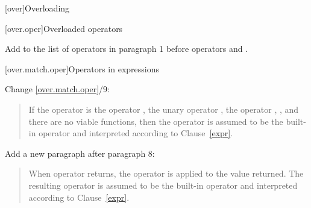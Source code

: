 
\setcounter{chapter}{12}
[over]{Overloading}

\setcounter{section}{4}
[over.oper]{Overloaded operators}

Add  to the list of operators in paragraph 1 before operators \tcode{()} and \tcode{[]}.

\setcounter{section}{3}
\setcounter{subsection}{1}
\setcounter{subsubsection}{1}
[over.match.oper]{Operators in expressions}%

Change \ref{over.match.oper}/9:

\begin{quote}
\setcounter{Paras}{8}
\pnum
If the operator is the operator
\tcode{,},
the unary operator
\tcode{\&},
 the operator
\tcode{->},
,
and there are no viable functions, then the operator is
assumed to be the built-in operator and interpreted according to
Clause~\ref{expr}.
\end{quote}

Add a new paragraph after paragraph 8:

\begin{quote}
\setcounter{Paras}{8}
\pnum
  When operator  returns, the  operator is applied to the value returned. The resulting  operator is assumed to be the built-in operator and interpreted according to Clause~\ref{expr}.
\end{quote}

%

